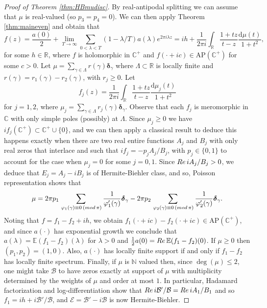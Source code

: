 \documentclass[a4paper,reqno,12pt]{amsart}
\newcommand{\B}{\mathcal{B}}
\newcommand{\E}{\mathcal{E}}
\renewcommand{\H}{\mathbb{C}^+}
\newcommand{\n}{\mathbb{N}}
\renewcommand{\r}{\mathbb{R}}
\newcommand{\cp}{\mathbb{C}} %
\newcommand{\re}{{\rm Re}\,}
\newcommand{\bo}{\boldsymbol}
\newcommand{\la}{\lambda}
\newcommand{\ga}{\gamma}
\newcommand{\p}{\varphi}
\renewcommand{\d}{\mathrm{d}}
\newcommand{\1}{{\bf 1}}
\newcommand{\apc}{\mathrm{AP}(\H)}
\renewcommand{\E}{\mathbb{E}}
\renewcommand{\1}{{\bo 1}}
\newcommand{\del}{{\bo \delta}}
\renewcommand{\a}{a(\cdot)}
\begin{document}
\begin{proof}[Proof of Theorem \ref{thm:HBmudisc}]
By real-antipodal splitting we can assume that $\mu$ is real-valued (so $p_3=p_4=0$). We can then apply Theorem \ref{thm:maineven} and obtain that
$$
f(z) = \frac{a(0)}{2} + \lim_{T\to\infty} \sum_{0<\la < T} (1-\la/T)a(\la)e^{2\pi i \la z} = ih + \frac{1}{2\pi i} \int_\r\frac{1+tz}{t-z}\frac{\d\mu(t)}{1+t^2},
$$
for some $h\in \r$, where $f$ is holomorphic in $\H$ and $f(\cdot + ic)\in \apc$ for some $c>0$. 
Let $\mu=\sum_{\ga \in \Lambda} r(\ga) \del_\ga$ where $\Lambda \subset \r$ is locally finite and $r(\ga)=r_1(\ga)-r_2(\ga)$, with $r_j\geq 0$. Let 
$$
f_j(z) =  \frac{1}{2\pi i}\int_\r \frac{1+tz}{t-z}\frac{\d \mu_j(t)}{1+t^2}
$$
for $j=1,2$, where $\mu_j=\sum_{\ga \in \Lambda} r_j(\ga) \del_\ga$. Observe that each $f_j$ is meromorphic in $\cp$ with only simple poles (possibly) at $\Lambda$. Since $\mu_j\geq 0$ we have $if_j(\H) \subset \H\cup\{0\}$, and we can then apply a classical result \cite[p.  308, Thm. 1]{L} to deduce this happens exactly when there are two real entire functions $A_j$ and $B_j$ with only real zeros that interlace and such that $if_j=-p_jA_j/B_j$, with $p_j\in \{0,1\}$ to account for the case when $\mu_j=0$ for some $j=0,1$. Since $\re iA_j/B_j>0$, we deduce that $E_j=A_j-iB_j$ is of Hermite-Biehler class, and so, Poisson representation shows that
$$
\mu = 2\pi p_1\sum_{\, \p_1(\ga)\equiv 0 \,({\rm mod} \, \pi)} \frac{1}{\p_1'(\ga)} {\del}_{\ga}-2\pi p_2\sum_{\, \p_2(\ga)\equiv 0 \,({\rm mod} \, \pi)} \frac{1}{\p_2'(\ga)} {\del}_{\ga}.
$$
Noting that $f=f_1-f_2+ih$, we obtain $f_1(\cdot+ic)-f_2(\cdot+ic)\in \apc$, and since $\a$ has exponential growth we conclude that $a(\la)=\E (f_1-f_2)(\la)$ for $\la>0$ and $\frac12 a(0)=\re \E (f_1-f_2)(0)$. If $\mu\geq 0$ then $(p_1,p_2)=(1,0)$. Also, $\a$ has locally finite support if and only if $f_1-f_2$ has locally finite spectrum. Finally, if $\mu$ is $\n$ valued then, since $\deg(\mu)\leq 2$, one might take $\B$ to have zeros exactly at support of $\mu$ with multiplicity determined by the weights of $\mu$ and order at most $1$. In particular, Hadamard factorization and log-differentiation show that $\re i\B'/\B=\re i A_1/B_1$ and so $f_1=ih + i\B'/\B$, and $\mathcal{E}=\B'-i\B$ is now Hermite-Biehler.
\end{proof}
\end{document}
